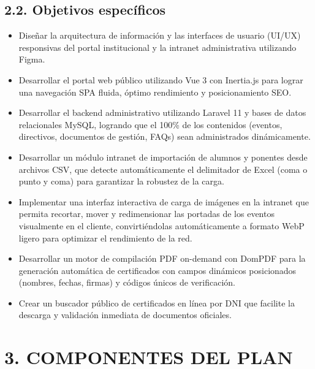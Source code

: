 \documentclass[11pt,a4paper]{article}
\begin{document}
\subsection*{2.2. Objetivos específicos}
\begin{itemize}
    \item Diseñar la arquitectura de información y las interfaces de usuario (UI/UX) responsivas del portal institucional y la intranet administrativa utilizando Figma.
    \item Desarrollar el portal web público utilizando Vue 3 con Inertia.js para lograr una navegación SPA fluida, óptimo rendimiento y posicionamiento SEO.
    \item Desarrollar el backend administrativo utilizando Laravel 11 y bases de datos relacionales MySQL, logrando que el 100\% de los contenidos (eventos, directivos, documentos de gestión, FAQs) sean administrados dinámicamente.
    \item Desarrollar un módulo intranet de importación de alumnos y ponentes desde archivos CSV, que detecte automáticamente el delimitador de Excel (coma o punto y coma) para garantizar la robustez de la carga.
    \item Implementar una interfaz interactiva de carga de imágenes en la intranet que permita recortar, mover y redimensionar las portadas de los eventos visualmente en el cliente, convirtiéndolas automáticamente a formato WebP ligero para optimizar el rendimiento de la red.
    \item Desarrollar un motor de compilación PDF on-demand con DomPDF para la generación automática de certificados con campos dinámicos posicionados (nombres, fechas, firmas) y códigos únicos de verificación.
    \item Crear un buscador público de certificados en línea por DNI que facilite la descarga y validación inmediata de documentos oficiales.
\end{itemize}

\section*{3. COMPONENTES DEL PLAN}
\end{document}
